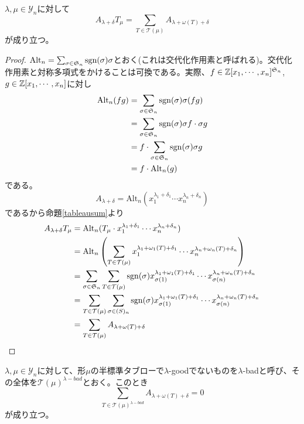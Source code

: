 \documentclass{ltjsreport}
\begin{document}
\begin{lemm}\label{equality}
    $\lambda,\mu\in\mathcal{Y}_n$に対して
    \[
    A_{\lambda+\delta}T_\mu=\sum_{T\in\mathcal{T}(\mu)}A_{\lambda+\omega(T)+\delta}
    \]
    が成り立つ。
\end{lemm}

\begin{proof}
    $\text{Alt}_n=\sum_{\sigma\in\mathfrak{S}_n}\mathrm{sgn}(\sigma)\sigma$とおく(これは交代化作用素と呼ばれる)。交代化作用素と対称多項式をかけることは可換である。実際、$f\in\mathbb{Z}[x_1,\cdots,x_n]^{\mathfrak{S}_n}$, $g\in\mathbb{Z}[x_1,\cdots,x_n]$に対し
    \begin{align*}
        \text{Alt}_n(fg)&=\sum_{\sigma\in\mathfrak{S}_n}\mathrm{sgn}(\sigma)\sigma(fg)\\
        &=\sum_{\sigma\in\mathfrak{S}_n}\mathrm{sgn}(\sigma)\sigma f\cdot \sigma g\\
        &=f\cdot\sum_{\sigma\in\mathfrak{S}_n}\mathrm{sgn}(\sigma)\sigma g\\
        &=f\cdot\text{Alt}_n(g)
    \end{align*}
    である。
    \[
    A_{\lambda+\delta}=\text{Alt}_n(x_1^{\lambda_1+\delta_1}\cdots x_n^{\lambda_n+\delta_n})
    \]
    であるから命題\ref{tableausum}より
    \begin{align*}
        A_{\lambda+\delta}T_\mu&=\text{Alt}_n(T_\mu\cdot x_1^{\lambda_1+\delta_1}\cdots x_n^{\lambda_n+\delta_n})\\
        &=\text{Alt}_n\left(
            \sum_{T\in\mathcal{T}(\mu)}x_1^{\lambda_1+\omega_1(T)+\delta_1}\cdots x_n^{\lambda_n+\omega_n(T)+\delta_n}
        \right)\\
        &=\sum_{\sigma\in\mathfrak{S}_n}\sum_{T\in\mathcal{T}(\mu)}\mathrm{sgn}(\sigma)x_{\sigma(1)}^{\lambda_1+\omega_1(T)+\delta_1}\cdots x_{\sigma(n)}^{\lambda_n+\omega_n(T)+\delta_n}\\
        &=\sum_{T\in\mathcal{T}(\mu)}\sum_{\sigma\in\mathfrak(S)_n}\mathrm{sgn}(\sigma)x_{\sigma(1)}^{\lambda_1+\omega_1(T)+\delta_1}\cdots x_{\sigma(n)}^{\lambda_n+\omega_n(T)+\delta_n}\\
        &=\sum_{T\in\mathcal{T}(\mu)}A_{\lambda+\omega(T)+\delta}
    \end{align*}
\end{proof}

\begin{lemm}\label{cancellation}
    $\lambda,\mu\in\mathcal{Y}_n$に対して、形$\mu$の半標準タブローで$\lambda$-goodでないものを$\lambda$-badと呼び、その全体を$\mathcal{T}(\mu)^{\lambda-bad}$とおく。このとき
    \[
    \sum_{T\in\mathcal{T}(\mu)^{\lambda-bad}}A_{\lambda+\omega(T)+\delta}=0    
    \]
    が成り立つ。
\end{lemm}
\end{document}
